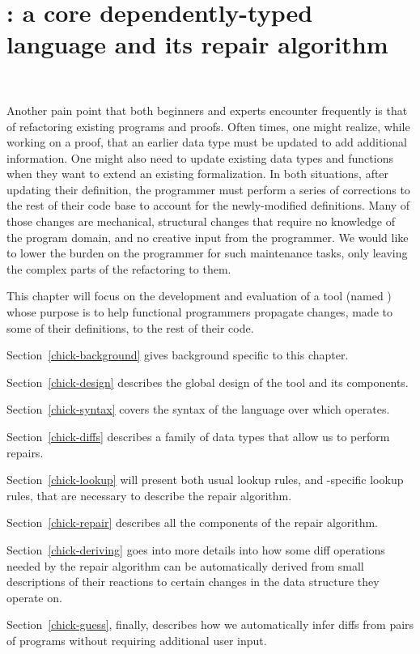 \chapter{\Chick{}: a core dependently-typed language and its repair
algorithm}~\label{chick}

Another pain point that both beginners and experts encounter frequently is that
of refactoring existing programs and proofs.  Often times, one might realize,
while working on a proof, that an earlier data type must be updated to add
additional information.  One might also need to update existing data types and
functions when they want to extend an existing formalization.  In both
situations, after updating their definition, the programmer must perform a
series of corrections to the rest of their code base to account for the
newly-modified definitions.  Many of those changes are mechanical, structural
changes that require no knowledge of the program domain, and no creative input
from the programmer.  We would like to lower the burden on the programmer for
such maintenance tasks, only leaving the complex parts of the refactoring to
them.

This chapter will focus on the development and evaluation of a tool (named
\Chick{}\footnotemark{}) whose purpose is to help functional programmers
propagate changes, made to some of their definitions, to the rest of their code.


Section~\ref{chick-background} gives background specific to this chapter.

Section~\ref{chick-design} describes the global design of the tool and its
components.

Section~\ref{chick-syntax} covers the syntax of the language over which \Chick{}
operates.

Section~\ref{chick-diffs} describes a family of data types that allow us to
perform repairs.

Section~\ref{chick-lookup} will present both usual lookup rules, and
\Chick{}-specific lookup rules, that are necessary to describe the repair
algorithm.

Section~\ref{chick-repair} describes all the components of the repair algorithm.

Section~\ref{chick-deriving} goes into more details into how some diff
operations needed by the repair algorithm can be automatically derived from
small descriptions of their reactions to certain changes in the data structure
they operate on.

Section~\ref{chick-guess}, finally, describes how we automatically infer diffs
from pairs of programs without requiring additional user input.









